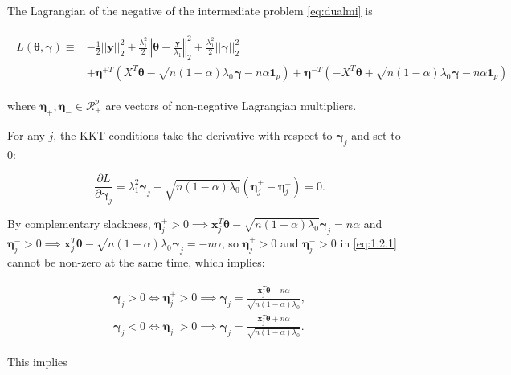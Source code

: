 The Lagrangian of the negative of the intermediate problem \eqref{eq:dualmi} is

\begin{gather}
    \begin{aligned}
        L(\boldsymbol\theta,\boldsymbol\gamma)\equiv&-\frac{1}{2}||\boldsymbol y||_2^2+\frac{\lambda_1^2}{2}\left\Vert\boldsymbol\theta-\frac{\boldsymbol y}{\lambda_1}\right\Vert_2^2+\frac{\lambda_1^2}{2}||\boldsymbol\gamma||_2^2\\
        &+\boldsymbol\eta^{+T}(X^T\boldsymbol\theta-\sqrt{n(1-\alpha)\lambda_0}\boldsymbol\gamma-n\alpha\mathbf{1}_p)+\boldsymbol\eta^{-T}(-X^T\boldsymbol\theta+\sqrt{n(1-\alpha)\lambda_0}\boldsymbol\gamma-n\alpha\mathbf{1}_p)
    \end{aligned}
\end{gather}

where $\boldsymbol\eta_+,\boldsymbol\eta_-\in \mathcal{R}^p_+$ are vectors of non-negative Lagrangian multipliers.

For any $j$, the KKT conditions take the derivative with respect to $\boldsymbol\gamma_j$ and set to 0:

\begin{equation}
    \label{eq:1.2.1}
    \frac{\partial L}{\partial \boldsymbol\gamma_j}=\lambda_1^2\boldsymbol\gamma_j-\sqrt{n(1-\alpha)\lambda_0}(\boldsymbol\eta_j^+-\boldsymbol\eta_j^-)=0.
\end{equation}

By complementary slackness, $\boldsymbol\eta_j^+>0\implies \boldsymbol x_j^T\boldsymbol\theta-\sqrt{n(1-\alpha)\lambda_0}\boldsymbol\gamma_j=n\alpha$ and $\boldsymbol\eta_j^->0\implies \boldsymbol x_j^T\boldsymbol\theta-\sqrt{n(1-\alpha)\lambda_0}\boldsymbol\gamma_j=-n\alpha$, so $\boldsymbol\eta_j^+>0$ and $\boldsymbol\eta_j^->0$ in \eqref{eq:1.2.1} cannot be non-zero at the same time, which implies:

\begin{gather}
    \begin{aligned}
        \boldsymbol\gamma_j>0\iff\boldsymbol\eta_j^+>0\implies \boldsymbol\gamma_j=\frac{\boldsymbol x_j^T\boldsymbol\theta-n\alpha}{\sqrt{n(1-\alpha)\lambda_0}},\\
        \boldsymbol\gamma_j<0\iff\boldsymbol\eta_j^->0\implies \boldsymbol\gamma_j=\frac{\boldsymbol x_j^T\boldsymbol\theta+n\alpha}{\sqrt{n(1-\alpha)\lambda_0}}.
    \end{aligned}
\end{gather}

This implies


